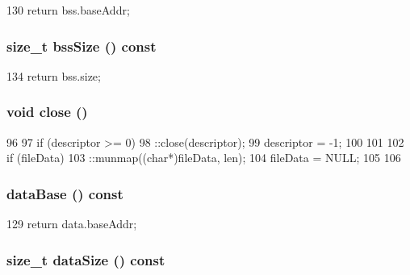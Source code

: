 \begin{DoxyCode}
130 { return bss.baseAddr; }
\end{DoxyCode}
\hypertarget{classObjectFile_af1e935fb177f10df6fd2d752a2c0abc8}{
\subsubsection[{bssSize}]{\setlength{\rightskip}{0pt plus 5cm}size\_\-t bssSize () const}}
\label{classObjectFile_af1e935fb177f10df6fd2d752a2c0abc8}



\begin{DoxyCode}
134 { return bss.size; }
\end{DoxyCode}
\hypertarget{classObjectFile_a5ae591df94fc66ccb85cbb6565368bca}{
\subsubsection[{close}]{\setlength{\rightskip}{0pt plus 5cm}void close ()}}
\label{classObjectFile_a5ae591df94fc66ccb85cbb6565368bca}



\begin{DoxyCode}
96 {
97     if (descriptor >= 0) {
98         ::close(descriptor);
99         descriptor = -1;
100     }
101 
102     if (fileData) {
103         ::munmap((char*)fileData, len);
104         fileData = NULL;
105     }
106 }
\end{DoxyCode}
\hypertarget{classObjectFile_a08072d959ffdf2624181b55cd9d1450d}{
\subsubsection[{dataBase}]{ dataBase () const}}
\label{classObjectFile_a08072d959ffdf2624181b55cd9d1450d}



\begin{DoxyCode}
129 { return data.baseAddr; }
\end{DoxyCode}
\hypertarget{classObjectFile_a71a8a324d6ab3da19c74380f2f264033}{
\subsubsection[{dataSize}]{\setlength{\rightskip}{0pt plus 5cm}size\_\-t dataSize () const}}
\label{classObjectFile_a71a8a324d6ab3da19c74380f2f264033}




